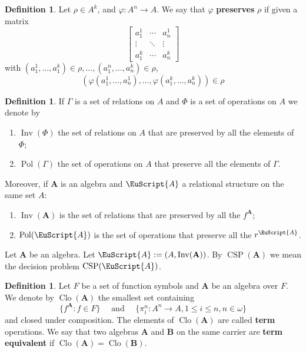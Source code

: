 \documentclass{amsart}
\theoremstyle{plain}
\theoremstyle{definition}
\newtheorem{definition}[theorem]{Definition}
\theoremstyle{remark}
\def\phi{\varphi}
\DeclareMathOperator{\Clo}{Clo}
\DeclareMathOperator{\CSP}{CSP}
\DeclareMathOperator{\Inv}{Inv}
\DeclareMathOperator{\Pol}{Pol}
\begin{document}
\begin{definition}
    Let $\rho \in A^k$, and $\phi: A^n \to A$. 
    We say that $\phi$ \textbf{preserves} $\rho$ if given a matrix 
    \begin{equation*}
        \begin{bmatrix}
          a_1^1 & \cdots & a^1_n \\
          \vdots & \ddots &  \vdots  \\
          a^k_1 & \cdots & a^k_n
          \end{bmatrix}
      \end{equation*}
      with $(a_1^1, \ldots, a^k_1) \in \rho, \ldots, (a_1^n, \ldots, a^k_n) \in \rho$, 
      \begin{equation*}
        (\phi(a_1^1 , \ldots , a^1_n), \ldots, \phi(a^k_1 , \ldots , a^k_n)) \in \rho
      \end{equation*}
\end{definition}

\begin{definition}
    If $\Gamma$ is a set of relations on $A$ and $\Phi$ is a set of operations on $A$ we denote by 
    \begin{enumerate}
        \item $\Inv(\Phi)$ the set of relations on $A$ that are preserved by all the elements of $\Phi$; 
        \item $\Pol(\Gamma)$ the set of operations on $A$ that preserve all the elements of $\Gamma$. 
    \end{enumerate}
    Moreover, if $\mathbf{A}$ is an algebra and $\EuScript{A}$ a relational structure on the same set $A$: 
    \begin{enumerate}
        \item $\Inv(\mathbf{A})$ is the set of relations that are preserved by all the $f^{\mathbf{A}}$;
        \item $\Pol(\EuScript{A})$ is the set of operations that preserve all the $r^{\EuScript{A}}$. 
    \end{enumerate} 
\end{definition}

Let $\mathbf{A}$ be an algebra. 
Let $\EuScript{A}:=(A, \Inv(\mathbf{A}))$. 
By $\CSP(\mathbf{A})$ we mean the decision problem $\CSP(\EuScript{A})$. 

\begin{definition}
    Let $F$ be a set of function symbols and $\mathbf{A}$ be an algebra over $F$. 
    We denote by $\Clo(\mathbf{A})$ the smallest set containing 
    \begin{equation*}
        \{f^\mathbf{A}: f \in F\} \quad \text{ and } \quad \{\pi^n_i: A^n \to A, 1 \le i \le n, n \in \omega\}
    \end{equation*}
and closed under composition. 
The elements of $\Clo(\mathbf{A})$ are called \textbf{term} operations. 
We say that two algebras $\mathbf{A}$ and $\mathbf{B}$ on the same carrier are \textbf{term equivalent} if $\Clo(\mathbf{A})=\Clo(\mathbf{B})$. 
\end{definition}
\end{document}
